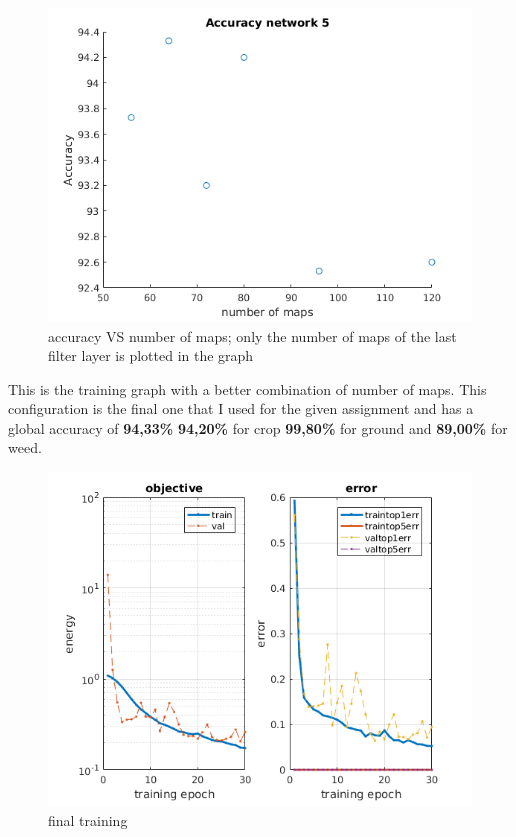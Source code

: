 \documentclass[]{report}
\begin{document}
\begin{figure}[h]
	\begin{center}
		\includegraphics[scale=0.6]{maps_accuracy.png}
		\caption{accuracy VS number of maps; only the number of maps of the last filter layer is plotted in the 					 graph}
		\label{fig:accuracyMaps}
	\end{center}
\end{figure}

\newpage   
This is the training graph with a better combination of number of maps. This configuration is the final one that I used for the given assignment and has a global accuracy of \textbf{94,33\%} \textbf{94,20\%} for crop \textbf{99,80\%} for ground and \textbf{89,00\%} for weed.

\begin{figure}[h]
	\begin{center}
		\includegraphics[scale=0.6]{final.png}
		\caption{final training}
		\label{fig:FinalTraining}
	\end{center}
\end{figure}
\end{document}
